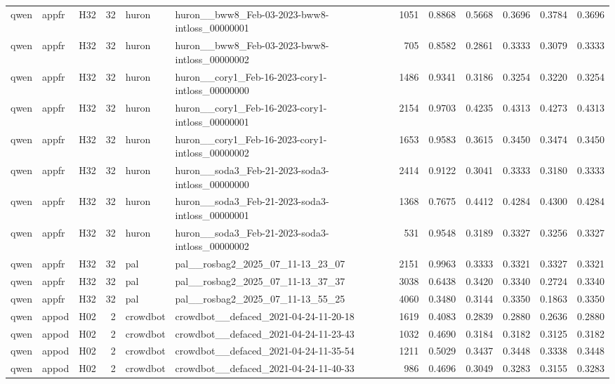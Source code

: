 \begin{table}[tbp]
\begin{tabular}{lllrllrrrrrr}
qwen & appfr & H32 & 32 & huron & huron\_\_bww8\_Feb-03-2023-bww8-intloss\_00000001 & 1051 & 0.8868 & 0.5668 & 0.3696 & 0.3784 & 0.3696 \\
qwen & appfr & H32 & 32 & huron & huron\_\_bww8\_Feb-03-2023-bww8-intloss\_00000002 & 705 & 0.8582 & 0.2861 & 0.3333 & 0.3079 & 0.3333 \\
qwen & appfr & H32 & 32 & huron & huron\_\_cory1\_Feb-16-2023-cory1-intloss\_00000000 & 1486 & 0.9341 & 0.3186 & 0.3254 & 0.3220 & 0.3254 \\
qwen & appfr & H32 & 32 & huron & huron\_\_cory1\_Feb-16-2023-cory1-intloss\_00000001 & 2154 & 0.9703 & 0.4235 & 0.4313 & 0.4273 & 0.4313 \\
qwen & appfr & H32 & 32 & huron & huron\_\_cory1\_Feb-16-2023-cory1-intloss\_00000002 & 1653 & 0.9583 & 0.3615 & 0.3450 & 0.3474 & 0.3450 \\
qwen & appfr & H32 & 32 & huron & huron\_\_soda3\_Feb-21-2023-soda3-intloss\_00000000 & 2414 & 0.9122 & 0.3041 & 0.3333 & 0.3180 & 0.3333 \\
qwen & appfr & H32 & 32 & huron & huron\_\_soda3\_Feb-21-2023-soda3-intloss\_00000001 & 1368 & 0.7675 & 0.4412 & 0.4284 & 0.4300 & 0.4284 \\
qwen & appfr & H32 & 32 & huron & huron\_\_soda3\_Feb-21-2023-soda3-intloss\_00000002 & 531 & 0.9548 & 0.3189 & 0.3327 & 0.3256 & 0.3327 \\
qwen & appfr & H32 & 32 & pal & pal\_\_rosbag2\_2025\_07\_11-13\_23\_07 & 2151 & 0.9963 & 0.3333 & 0.3321 & 0.3327 & 0.3321 \\
qwen & appfr & H32 & 32 & pal & pal\_\_rosbag2\_2025\_07\_11-13\_37\_37 & 3038 & 0.6438 & 0.3420 & 0.3340 & 0.2724 & 0.3340 \\
qwen & appfr & H32 & 32 & pal & pal\_\_rosbag2\_2025\_07\_11-13\_55\_25 & 4060 & 0.3480 & 0.3144 & 0.3350 & 0.1863 & 0.3350 \\
qwen & appod & H02 & 2 & crowdbot & crowdbot\_\_defaced\_2021-04-24-11-20-18 & 1619 & 0.4083 & 0.2839 & 0.2880 & 0.2636 & 0.2880 \\
qwen & appod & H02 & 2 & crowdbot & crowdbot\_\_defaced\_2021-04-24-11-23-43 & 1032 & 0.4690 & 0.3184 & 0.3182 & 0.3125 & 0.3182 \\
qwen & appod & H02 & 2 & crowdbot & crowdbot\_\_defaced\_2021-04-24-11-35-54 & 1211 & 0.5029 & 0.3437 & 0.3448 & 0.3338 & 0.3448 \\
qwen & appod & H02 & 2 & crowdbot & crowdbot\_\_defaced\_2021-04-24-11-40-33 & 986 & 0.4696 & 0.3049 & 0.3283 & 0.3155 & 0.3283 \\

\end{tabular}
\end{table}
